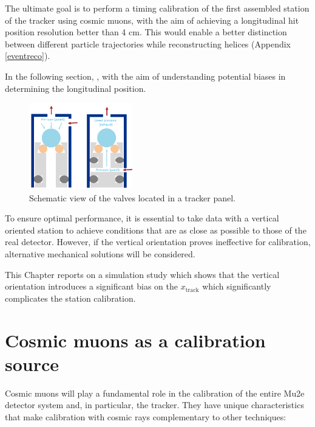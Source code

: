 The ultimate goal is to perform a timing calibration of 
the first assembled station of the tracker using 
cosmic muons, with the aim of achieving a longitudinal hit 
position resolution better than 4 cm. This would enable a better distinction 
between different particle trajectories while reconstructing helices (Appendix \ref{eventreco}).

In the following section, 
,
with the aim of understanding 
potential biases in determining the longitudinal position.

\begin{figure}[!h]
    \centering
    \includegraphics[width =0.4\textwidth]{figures/png/gassystem.png}
    \caption[Schematic view of the valves located in a tracker panel.]{Schematic view of the valves located in a tracker panel.}
    \label{fig:gassystem}
\end{figure}
To ensure optimal performance, it is essential to take data with a vertical oriented station 
to achieve conditions that are as close as possible to those of the real detector. 
However, if the vertical orientation proves ineffective for calibration, 
alternative mechanical solutions will be considered.

This Chapter reports on a simulation study 
which shows that the vertical orientation introduces a significant bias on 
the $x_{\text{track}}$ which significantly complicates 
the station calibration. 



\section{Cosmic muons as a calibration source}
Cosmic muons will play a fundamental role in the 
calibration of the entire Mu2e detector system and, 
in particular, the tracker. They have unique 
characteristics that make calibration with cosmic rays 
complementary to other techniques:

